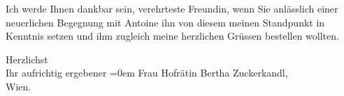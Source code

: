 \pstart
           Ich werde Ihnen dankbar sein, verehrteste Freundin, wenn Sie anlässlich einer
               neuerlichen Begegnung mit Antoine ihn von
               diesem meinen Standpunkt in Kenntnis setzen und ihm zugleich meine herzlichen Grüssen
               bestellen wollten.\pend
           
\pstart
           Herzlichst{\\[\baselineskip]} Ihr aufrichtig ergebener\pend
           \leftskip=0em{}{\vspace{1\baselineskip}}
\pstart
           \noindent{}Frau Hofrätin Bertha Zuckerkandl,{\\}Wien.\pend
           \endnumbering{}
\begin{anhang}
\end{anhang}\newcommand{\dateiname}{L03975}\newcommand{\titel}{Arthur Schnitzler an Berta Zuckerkandl, 4. 3. 1929}\newcommand{\editorInnen}{Herausgegeben von Jahnke, SelmaMüller, Martin Anton}
